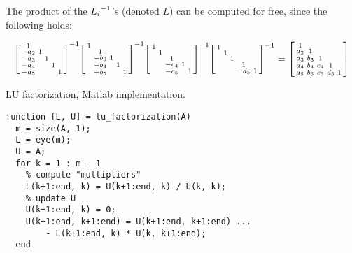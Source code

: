 \documentclass[computational_mathematics.tex]{subfiles}
\begin{document}
\begin{obs}\label{obs:21novstroke1}
  The product of the ${L_i}^{-1}$'s (denoted $L$) can be computed for free, since the following holds:

\begin{gather*}
\begin{bsmallmatrix}
    1 & \\
    -a_2 & 1 & \\
    -a_3 &  & 1  \\
    -a_4 &  & & 1  \\
    -a_5 &  &  & & 1 
\end{bsmallmatrix}^{-1}
\begin{bsmallmatrix}
    1 & \\
     & 1 & \\
     & -b_3 & 1  \\
     & -b_4 & & 1  \\
     & -b_5 &  & & 1 
\end{bsmallmatrix}^{-1}
\begin{bsmallmatrix}
    1 & \\
     & 1 & \\
     &  & 1  \\
     &  & -c_4& 1  \\
     &  & -c_5 & & 1 
\end{bsmallmatrix}^{-1} 
\begin{bsmallmatrix}
    1 & \\
     & 1 & \\
     &  & 1  \\
     &  & & 1  \\
     &  &  & -d_5& 1 
\end{bsmallmatrix}^{-1}
= \begin{bsmallmatrix}
    1 & \\
    a_2 & 1 & \\
    a_3 & b_3 & 1  \\
    a_4 & b_4 & c_4& 1  \\
    a_5 & b_5 & c_5 &d_5 & 1     
\end{bsmallmatrix}
\end{gather*}
\end{obs}

\begin{center}
\begin{minipage}{.9\linewidth}
  \begin{algorithm}[H]
    \caption{LU factorization, Matlab implementation.}\label{algo:21nov1}
    \begin{verbatim}
function [L, U] = lu_factorization(A)
  m = size(A, 1);
  L = eye(m);
  U = A;
  for k = 1 : m - 1
    % compute "multipliers"
    L(k+1:end, k) = U(k+1:end, k) / U(k, k);
    % update U 
    U(k+1:end, k) = 0;
    U(k+1:end, k+1:end) = U(k+1:end, k+1:end) ... 
        - L(k+1:end, k) * U(k, k+1:end);
  end
    \end{verbatim}
  \end{algorithm}
\end{minipage}
\end{center}
\vspace{0.5cm}
\end{document}

